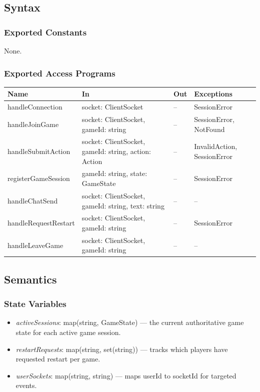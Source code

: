 \documentclass[12pt, titlepage]{article}
\begin{document}
\subsection{Syntax}

\subsubsection{Exported Constants}
None.

\subsubsection{Exported Access Programs}

\begin{center}
    \begin{tabular}{p{4.0cm} p{4.5cm} p{3.0cm} p{3.5cm}}
        \toprule
        \textbf{Name} & \textbf{In} & \textbf{Out} & \textbf{Exceptions} \\
        \midrule
        handleConnection & socket: ClientSocket & -- & SessionError \\
        handleJoinGame & socket: ClientSocket, gameId: string & -- & SessionError, NotFound \\
        handleSubmitAction & socket: ClientSocket, gameId: string, action: Action & -- & InvalidAction, SessionError \\
        registerGameSession & gameId: string, state: GameState & -- & SessionError \\
        handleChatSend & socket: ClientSocket, gameId: string, text: string & -- & -- \\
        handleRequestRestart & socket: ClientSocket, gameId: string & -- & SessionError \\
        handleLeaveGame & socket: ClientSocket, gameId: string & -- & -- \\
        \bottomrule
    \end{tabular}
\end{center}

\subsection{Semantics}

\subsubsection{State Variables}
\begin{itemize}
    \item \textit{activeSessions}: map(string, GameState) --- the current authoritative game state for each active game session.
    \item \textit{restartRequests}: map(string, set(string)) --- tracks which players have requested restart per game.
    \item \textit{userSockets}: map(string, string) --- maps userId to socketId for targeted events.
\end{itemize}
\end{document}
